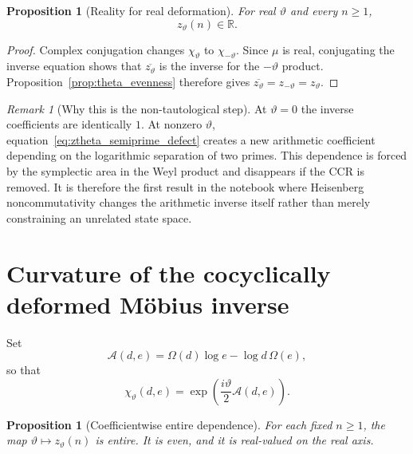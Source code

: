 \documentclass[11pt]{amsart}
\numberwithin{equation}{section}
\theoremstyle{plain}
\newtheorem{proposition}[theorem]{Proposition}
\theoremstyle{definition}
\theoremstyle{remark}
\newtheorem{remark}[theorem]{Remark}
\begin{document}
\begin{proposition}[Reality for real deformation]
\label{prop:ztheta_real}
For real \(\vartheta\) and every \(n\ge1\),
\begin{equation}
z_\vartheta(n)\in\mathbb R.
\label{eq:ztheta_real}
\end{equation}
\end{proposition}

\begin{proof}
Complex conjugation changes \(\chi_\vartheta\) to
\(\chi_{-\vartheta}\).  Since \(\mu\) is real, conjugating the inverse
equation shows that \(\overline{z_\vartheta}\) is the inverse for the
\(-\vartheta\) product.  Proposition~\ref{prop:theta_evenness} therefore
gives \(\overline{z_\vartheta}=z_{-\vartheta}=z_\vartheta\).
\end{proof}

\begin{remark}[Why this is the non-tautological step]
\label{rem:non_tautological_step}
At $\vartheta=0$ the inverse coefficients are identically $1$.  At nonzero
$\vartheta$, equation~\eqref{eq:ztheta_semiprime_defect} creates a new
arithmetic coefficient depending on the logarithmic separation of two
primes.  This dependence is forced by the symplectic area in the Weyl
product and disappears if the CCR is removed.  It is therefore the first
result in the notebook where Heisenberg noncommutativity changes the
arithmetic inverse itself rather than merely constraining an unrelated
state space.
\end{remark}

\section{Curvature of the cocyclically deformed M\"obius inverse}
\label{sec:cohomological_curvature}

Set
\begin{equation}
\mathcal A(d,e)=\Omega(d)\log e-\log d\,\Omega(e),
\label{eq:arith_symplectic_area_curv}
\end{equation}
so that
\begin{equation}
\chi_\vartheta(d,e)=\exp\!\left(\frac{i\vartheta}{2}\mathcal A(d,e)\right).
\label{eq:chi_area_curv}
\end{equation}

\begin{proposition}[Coefficientwise entire dependence]
\label{prop:ztheta_entire_coefficientwise}
For each fixed \(n\ge1\), the map \(\vartheta\mapsto z_\vartheta(n)\) is
entire. It is even, and it is real-valued on the real axis.
\end{proposition}
\end{document}
